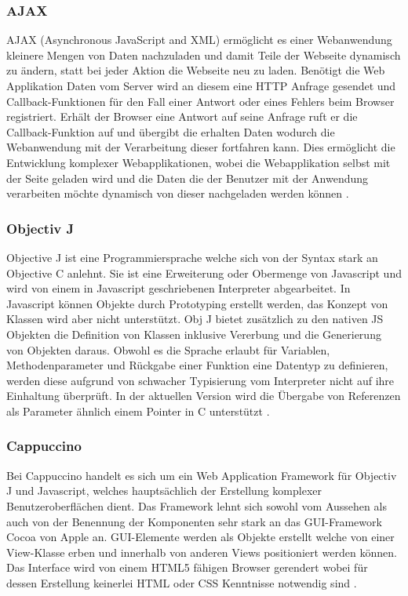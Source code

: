 \subsubsection{AJAX}
\label{sec:AJAX}
AJAX (Asynchronous JavaScript and XML) ermöglicht es einer Webanwendung kleinere Mengen von Daten nachzuladen und damit Teile der Webseite dynamisch zu ändern, 
statt bei jeder Aktion die Webseite neu zu laden.
Benötigt die Web Applikation Daten vom Server wird an diesem eine HTTP Anfrage gesendet und Callback-Funktionen für den Fall einer Antwort oder eines Fehlers beim Browser registriert.
Erhält der Browser eine Antwort auf seine Anfrage ruft er die Callback-Funktion auf und übergibt die erhalten Daten wodurch die Webanwendung mit der Verarbeitung dieser fortfahren kann.
Dies ermöglicht die Entwicklung komplexer Webapplikationen, wobei die Webapplikation selbst mit der Seite geladen wird und die Daten die der Benutzer mit der Anwendung verarbeiten möchte dynamisch von dieser nachgeladen werden können \cite{ajax}.

\subsubsection{Objectiv J}
\label{sec:Objectiv J}

Objective J ist eine Programmiersprache welche sich von der Syntax stark an Objective C anlehnt.
Sie ist eine Erweiterung oder Obermenge von Javascript und wird von einem in Javascript geschriebenen Interpreter abgearbeitet.
In Javascript können Objekte durch Prototyping erstellt werden, das Konzept von Klassen wird aber nicht unterstützt.
Obj J bietet zusätzlich zu den nativen JS Objekten die Definition von Klassen inklusive Vererbung und die Generierung von Objekten daraus.
Obwohl es die Sprache erlaubt für Variablen, Methodenparameter und Rückgabe einer Funktion eine Datentyp zu definieren, 
werden diese aufgrund von schwacher Typisierung vom Interpreter nicht auf ihre Einhaltung überprüft.
In der aktuellen Version wird die Übergabe von Referenzen als Parameter ähnlich einem Pointer in C unterstützt \cite{capp}.

\subsubsection{Cappuccino}
\label{sec:Cappuccino}
Bei Cappuccino handelt es sich um ein Web Application Framework für Objectiv J und Javascript, welches hauptsächlich der Erstellung komplexer Benutzeroberflächen dient.
Das Framework lehnt sich sowohl vom Aussehen als auch von der Benennung der Komponenten sehr stark an das GUI-Framework Cocoa von Apple an.
GUI-Elemente werden als Objekte erstellt welche von einer View-Klasse erben und innerhalb von anderen Views positioniert werden können.
Das Interface wird von einem HTML5 fähigen Browser gerendert wobei für dessen Erstellung keinerlei HTML oder CSS Kenntnisse notwendig sind \cite{capp}.


